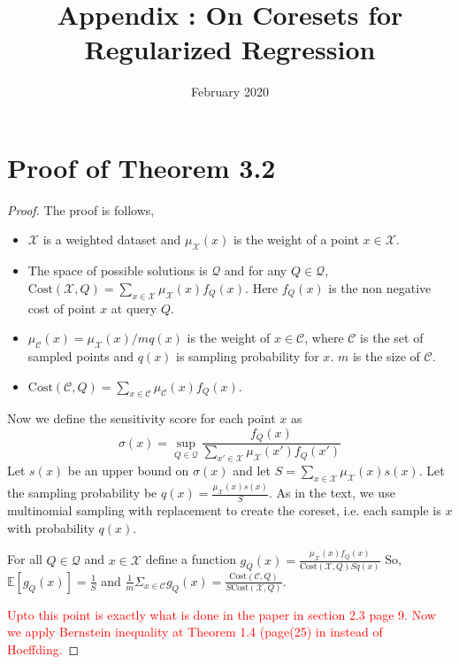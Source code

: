 \documentclass{article}
\title{Appendix : On Coresets for Regularized Regression}
\date{February 2020}
\begin{document}
\maketitle{}

\section*{Proof of Theorem 3.2}
\begin{proof}
The proof is follows,
\begin{itemize}
		\item $\mathcal{X}$ is a weighted dataset and $\mu_{\mathcal{X}}(x)$ is the weight of a point $x \in \mathcal{X}$.
		\item The space of possible solutions is $\mathcal{Q}$ and for any $Q \in \mathcal{Q}$, $\mbox{Cost}(\mathcal{X},Q) = \sum_{x \in \mathcal{X}} \mu_{\mathcal{X}}(x) f_{Q}(x)$. Here $f_{Q}(x)$ is the non negative cost of point $x$ at query $Q$.
		\item ${\mu}_\mathcal{C}(x) = {\mu}_{\mathcal{X}}(x)/mq(x)$ is the weight of $x \in \mathcal{C}$, where $\mathcal{C}$ is the set of sampled points and $q(x)$ is sampling probability for $x$. $m$ is the size of $\mathcal{C}$.
		\item $\mbox{Cost}(\mathcal{C},Q) = \sum_{x \in \mathcal{C}} {\mu}_\mathcal{C}(x) f_{Q}(x)$.
	\end{itemize}
	
Now we define the sensitivity score for each point $x$ as
$$\sigma(x) = \sup_{Q \in \mathcal{Q}} \frac{f_{Q}(x)}{\sum_{x' \in \mathcal{X}} \mu_{\mathcal{X}}(x') f_{Q}(x')}$$
Let $s(x)$ be an upper bound on $\sigma(x)$ and let $S =\sum_{x \in \mathcal{X}} \mu_\mathcal{X}(x) s(x)$. 
Let the sampling probability be $q(x) = \frac{\mu_\mathcal{X}(x)s(x)}{S}$. As in the text, we use multinomial sampling with replacement to create the coreset, i.e. each sample is $x$ with probability $q(x)$.

For all $Q \in \mathcal{Q}$ and $x \in \mathcal{X}$ define a function  
$g_{Q}(x) =\frac{\mu_{\mathcal{X}}(x)f_{Q}(x)}{\mbox{Cost}(\mathcal{X},Q) Sq(x)}$                                
So, $\mathbb{E}[g_{Q}(x)]=\frac{1}{S}$ and 
$\frac{1}{m}\Sigma_{x\in \mathcal{C}}g_{Q}(x)=\frac{\mbox{Cost}(\mathcal{C},Q)} {S\mbox{Cost}(\mathcal{X},Q)}$. 

\textcolor{red}{Upto this point is exactly what is done in the paper in section 2.3 page 9. Now we apply Bernstein inequality at Theorem 1.4 (page(25) in \cite{dubhashi2009concentration} instead of Hoeffding.}


\end{proof}
\end{document}
